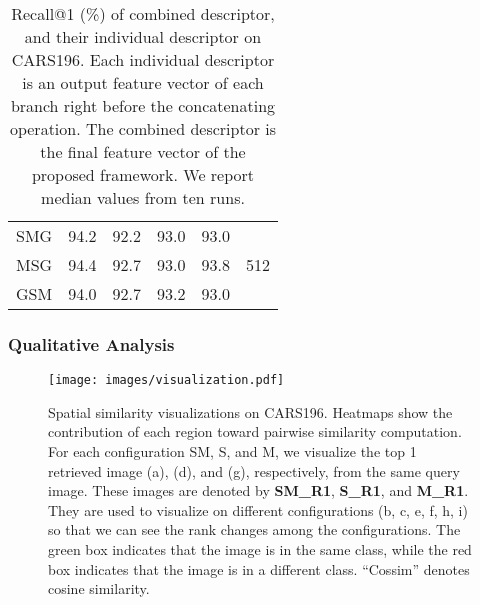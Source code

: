 \documentclass[10pt,twocolumn,letterpaper]{article}
\begin{document}
\begin{CJK}{UTF8}{mj}
\begin{table}[h]
\begin{center}
\begin{adjustbox}{width=0.85\columnwidth,center}
\begin{tabular}{c|c|ccc|c}
SMG                     & 94.2                                                                            & 92.2 & 93.0 & 93.0 & \multirow{3}{*}{512}  \\
MSG                     & 94.4                                                                            & 92.7 & 93.0 & 93.8 &                       \\
GSM                     & 94.0                                                                            & 92.7 & 93.2 & 93.0 &                       \\ \hline
\end{tabular}
\end{adjustbox}
\end{center}
\caption{Recall@1 (\%) of combined descriptor, and their individual descriptor on CARS196.
Each individual descriptor is an output feature vector of each branch right before the concatenating operation.
The combined descriptor is the final feature vector of the proposed framework.
We report median values from ten runs.}
\label{table:individual_descriptor}
\vspace{-0.7em}
\end{table}

\subsubsection{Qualitative Analysis} \label{sec:qualitative_analysis}

\begin{figure*}[h!t!]
\vspace{-0.5em}
\begin{center}
\texttt{[image: images/visualization.pdf]}
\end{center}
   \caption{Spatial similarity visualizations on CARS196.
Heatmaps show the contribution of each region toward pairwise similarity computation.
   For each configuration SM, S, and M, we visualize the top 1 retrieved image (a), (d), and (g), respectively, from the same query image.
   These images are denoted by {\color{red}\textbf{SM\_R1}}, {\color{blue}\textbf{S\_R1}}, and {\color{OliveGreen}\textbf{M\_R1}}.
   They are used to visualize on different configurations (b, c, e, f, h, i) so that we can see the rank changes among the configurations.
   The green box indicates that the image is in the same class, while the red box indicates that the image is in a different class.
   ``Cossim'' denotes cosine similarity.
   }
\label{fig:vis}
\vspace{-0.3em}
\end{figure*}


\end{CJK}
\end{document}
